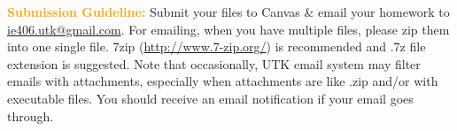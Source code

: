 \documentclass{article}
\begin{document}
\vskip 0.3in 

\textcolor{orange}{\bf Submission Guideline:} Submit your files to Canvas \& email your homework to \url{ie406.utk@gmail.com}. 
For emailing, when you have multiple files, please zip them
into one single file. 7zip (\url{http://www.7-zip.org/}) is recommended and .7z file extension is suggested. Note that occasionally, UTK email system may filter emails with attachments, especially when attachments are like .zip and/or with executable files. You should receive an email notification if your email goes through. 
\end{document}
